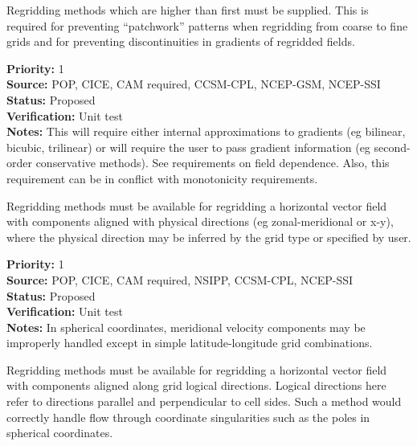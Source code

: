 
Regridding methods which are higher than first 
must be supplied.  This is required for preventing
``patchwork'' patterns when regridding from coarse to fine
grids and for preventing discontinuities in gradients of
regridded fields.

\begin{reqlist}
{\bf Priority:} 1 \\
{\bf Source:}  POP, CICE, CAM required, CCSM-CPL, NCEP-GSM, NCEP-SSI \\
{\bf Status:} Proposed \\
{\bf Verification:} Unit test \\
{\bf Notes:} This will require either internal approximations to
             gradients (eg bilinear, bicubic, trilinear) or will require the
             user to pass gradient information (eg second-order conservative
             methods).  See requirements on field dependence.  Also, this
             requirement can be in conflict with monotonicity requirements.
\end{reqlist}


Regridding methods must be available for regridding a horizontal
vector field with components aligned with physical directions
(eg zonal-meridional or x-y), where the physical direction may be
inferred by the grid type or specified by user.

\begin{reqlist}
{\bf Priority:} 1 \\
{\bf Source:}  POP, CICE, CAM required, NSIPP, CCSM-CPL, NCEP-SSI \\
{\bf Status:} Proposed \\
{\bf Verification:} Unit test \\
{\bf Notes:} In spherical coordinates, meridional velocity components
             may be improperly handled except in simple latitude-longitude
             grid combinations.
\end{reqlist}


Regridding methods must be available for regridding a horizontal
vector field with components aligned along grid logical directions.
Logical directions here refer to directions parallel and perpendicular
to cell sides.  Such a method would correctly handle flow through 
coordinate singularities such as the poles in spherical coordinates.

